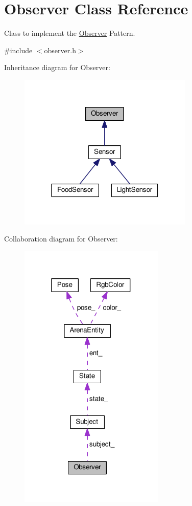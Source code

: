 \hypertarget{classObserver}{}\section{Observer Class Reference}
\label{classObserver}


Class to implement the \hyperlink{classObserver}{Observer} Pattern.  




{\ttfamily \#include $<$observer.\+h$>$}



Inheritance diagram for Observer\+:\nopagebreak
\begin{figure}[H]
\begin{center}
\leavevmode
\includegraphics[width=236pt]{classObserver__inherit__graph}
\end{center}
\end{figure}


Collaboration diagram for Observer\+:\nopagebreak
\begin{figure}[H]
\begin{center}
\leavevmode
\includegraphics[width=196pt]{classObserver__coll__graph}
\end{center}
\end{figure}
